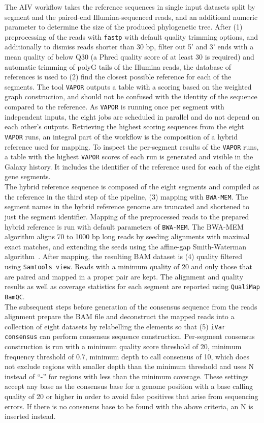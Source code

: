 The \ac{AIV} workflow takes the reference sequences in single input datasets split by segment and the paired-end Illumina-sequenced reads, and an additional numeric parameter to determine the size of the produced phylogenetic tree. After (1) preprocessing of the reads with \texttt{fastp} with default quality trimming options, and additionally to dismiss reads shorter than 30 bp, filter out 5' and 3' ends with a mean quality of below Q30 (a Phred quality score of at least 30 is required) and automatic trimming of polyG tails of the Illumina reads, the database of references is used to (2) find the closest possible reference for each of the segments. The tool \texttt{VAPOR} outputs a table with a scoring based on the weighted graph construction, and should not be confused with the identity of the sequence compared to the reference. As \texttt{VAPOR} is running once per segment with independent inputs, the eight jobs are scheduled in parallel and do not depend on each other's outputs. Retrieving the highest scoring sequences from the eight \texttt{VAPOR} runs, an integral part of the workflow is the composition of a hybrid reference used for mapping. To inspect the per-segment results of the \texttt{VAPOR} runs, a table with the highest \texttt{VAPOR} scores of each run is generated and visible in the Galaxy history. It includes the identifier of the reference used for each of the eight gene segments.\\
The hybrid reference sequence is composed of the eight segments and compiled as the reference in the third step of the pipeline, (3) mapping with \texttt{BWA-MEM}. The segment names in the hybrid reference genome are truncated and shortened to just the segment identifier. Mapping of the preprocessed reads to the prepared hybrid reference is run with default parameters of \texttt{BWA-MEM}. The \ac{BWA-MEM} algorithm aligns 70 to 1000 bp long reads by seeding alignments with maximal exact matches, and extending the seeds using the affine-gap Smith-Waterman algorithm~\cite{li2013aligning}. After mapping, the resulting \ac{BAM} dataset is (4) quality filtered using \texttt{Samtools view}. Reads with a minimum quality of 20 and only those that are paired and mapped in a proper pair are kept. The alignment and quality results as well as coverage statistics for each segment are reported using \texttt{QualiMap BamQC}. \\
The subsequent steps before generation of the consensus sequence from the reads alignment prepare the \ac{BAM} file and deconstruct the mapped reads into a collection of eight datasets by relabelling the elements so that (5) \texttt{iVar consensus} can perform consensus sequence construction. Per-segment consensus construction is run with a minimum quality score threshold of 20, minimum frequency threshold of 0.7, minimum depth to call consensus of 10, which does not exclude regions with smaller depth than the minimum threshold and uses N instead of ``-'' for regions with less than the minimum coverage. These settings accept any base as the consensus base for a genome position with a base calling quality of 20 or higher in order to avoid false positives that arise from sequencing errors. If there is no consensus base to be found with the above criteria, an N is inserted instead. \\
